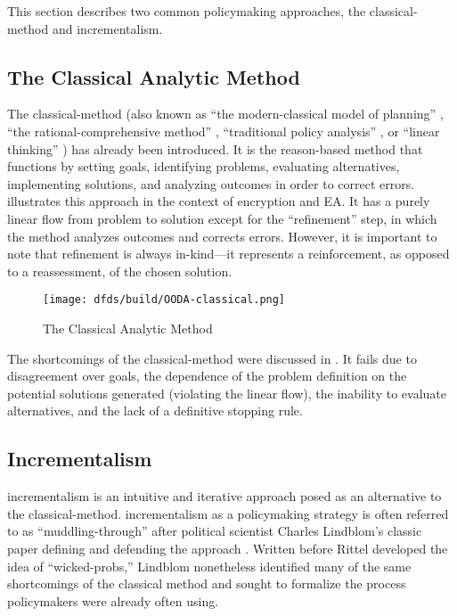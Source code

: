 This section describes two common policymaking approaches, the \ac{classical-method} and \ac{incrementalism}.

\subsection{The Classical Analytic Method}

The \ac{classical-method} \cite{feeley_judicial_2000} (also known as ``the modern-classical model of planning''
\cite{rittel_dilemmas_1973}, ``the rational-comprehensive method'' \cite{lindblom_muddling_1959}, ``traditional policy
analysis'' \cite{rozenshtein_wicked_2018}, or ``linear thinking'' \cite{commission_tackling_2018}) has already been
introduced. It is the reason-based method that functions by setting goals, identifying problems, evaluating
alternatives, implementing solutions, and analyzing outcomes in order to correct errors. 
illustrates this approach in the context of encryption and \ac{EA}. It has a purely linear flow from problem to solution
except for the ``refinement'' step, in which the method analyzes outcomes and corrects errors. However, it is important
to note that refinement is always in-kind---it represents a reinforcement, as opposed to a reassessment, of the chosen
solution.

\begin{figure}[h]
  \centering\CaptionFontSize
  \texttt{[image: dfds/build/OODA-classical.png]}
  \caption{The Classical Analytic Method}
  \label{fig-classical-method}
\end{figure}

The shortcomings of the \ac{classical-method} were discussed in . It fails due to
disagreement over goals, the dependence of the problem definition on the potential solutions generated (violating the
linear flow), the inability to evaluate alternatives, and the lack of a definitive stopping rule.

\subsection{Incrementalism}

\Ac{incrementalism} is an intuitive and iterative approach posed as an alternative to the \ac{classical-method}.
\Ac{incrementalism} as a policymaking strategy is often referred to as ``\ac{muddling-through}'' after political
scientist Charles Lindblom's classic paper defining and defending the approach \cite{lindblom_muddling_1959}. Written
before Rittel developed the idea of ``\acp{wicked-prob},'' Lindblom nonetheless identified many of the same shortcomings
of the classical method and sought to formalize the process policymakers were already often using.

